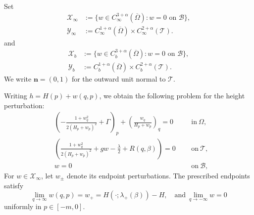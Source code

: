 \documentclass[12pt,letterpaper]{amsart}
\numberwithin{equation}{section}
\begin{document}
	Set
	\begin{align*}
		\mathscr X_\infty&:=\{w\in C_\infty^{3+\alpha}(\overline\Omega):w=0\text{ on }\mathcal B\},\\
		\mathscr Y_\infty&:=C_\infty^{1+\alpha}(\overline\Omega)
		\times C_\infty^{2+\alpha}(\mathcal T).
	\end{align*}
	and
	\begin{align*}
		\mathscr X_b&:=\{w\in C_b^{3+\alpha}(\overline\Omega):w=0\text{ on }\mathcal B\},\\
		\mathscr Y_b&:=C_b^{1+\alpha}(\overline\Omega)
		\times C_b^{2+\alpha}(\mathcal T).
	\end{align*}
	{We write $\mathbf n=(0,1)$ for the outward unit normal to $\mathcal T$.}
	
	
	
	
	
	
	
	
	
	
	
	
	
	
	
	
	
	
	
	
	
	
	
	
	
	
	
	
	
	
	
	
	
	
	
	
	
	
	
	
	
	
	
	
	
	
	
	
	

	

	
	
	

	
	{Writing $h=H(p)+w(q,p)$, we obtain the following problem for the height perturbation:}
	\begin{equation}\label{wpde}
		\begin{aligned}
			&\left( -\frac{1 + w_q^2}{2(H_{p} + w_p)^2} + \Gamma \right)_p + \left( \frac{w_q}{H_{p} + w_p} \right)_q=0\quad&&\mathrm{in~}\Omega,\\
			&\left( \frac{1 + w_q^2}{2(H_{p} + w_p)^2} + gw - \frac{\lambda}{2} + R(q, \beta) \right)=0&&{\mathrm{on~}\mathcal T},\\
			&w=0&&{\mathrm{on~}\mathcal B},
		\end{aligned}
	\end{equation}
	{For $w\in\mathscr X_\infty$, let $w_\pm$ denote its endpoint perturbations. The prescribed endpoints satisfy}
$$\lim_{q\to\infty}w(q,p)=w_+=H(\cdot;\lambda_+(\beta))-H,\quad\mathrm{and~}\lim_{q\to-\infty}w=0$$
	uniformly in $p\in[-m,0]$.
	
\end{document}
